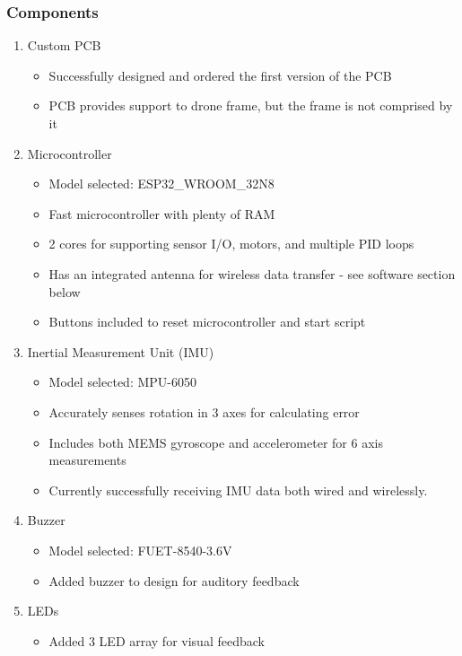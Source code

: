 \documentclass[12pt, titlepage]{article}
\begin{document}
\subsubsection{Components}
\begin{enumerate}

\item Custom PCB
\begin{itemize}
\item Successfully designed and ordered the first version of the PCB
\item PCB provides support to drone frame, but the frame is not comprised by it
\end{itemize}

\item Microcontroller
\begin{itemize}
\item Model selected: ESP32\_WROOM\_32N8 
\item Fast microcontroller with plenty of RAM
\item 2 cores for supporting sensor I/O, motors, and multiple PID loops
\item Has an integrated antenna for wireless data transfer - see software section below
\item Buttons included to reset microcontroller and start script
\end{itemize}

\item Inertial Measurement Unit (IMU)
\begin{itemize}
\item Model selected: MPU-6050
\item Accurately senses rotation in 3 axes for calculating error
\item Includes both MEMS gyroscope and accelerometer for 6 axis measurements
\item Currently successfully receiving IMU data both wired and wirelessly.
\end{itemize}

\item Buzzer
\begin{itemize}
\item Model selected: FUET-8540-3.6V
\item Added buzzer to design for auditory feedback
\end{itemize}

\item LEDs
\begin{itemize}
\item Added 3 LED array for visual feedback
\end{itemize}


\end{enumerate}
\end{document}
